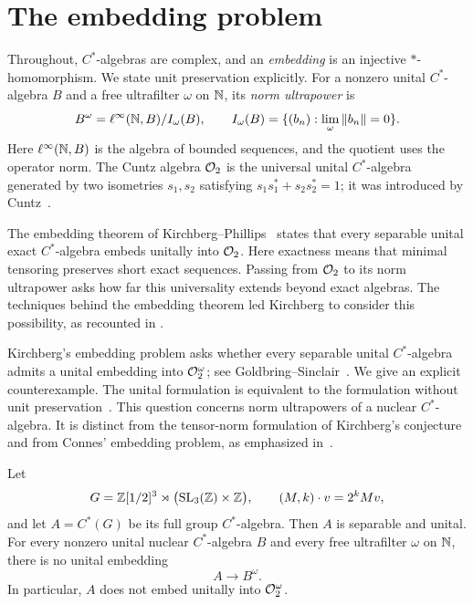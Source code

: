 \section{The embedding problem}
\label{sec:introduction}

Throughout, $C^*$-algebras are complex, and an \emph{embedding} is an
injective $*$-homomorphism. We state unit preservation explicitly.
For a nonzero unital $C^*$-algebra $B$ and a free ultrafilter $\omega$ on
$\mathbb N$, its \emph{norm ultrapower} is
\[
 B^\omega=\ell^\infty(\mathbb N,B)/I_\omega(B),\qquad
 I_\omega(B)=\{(b_n):\lim_\omega\|b_n\|=0\}.
\]
Here $\ell^\infty(\mathbb N,B)$ is the algebra of bounded sequences, and the
quotient uses the operator norm. The Cuntz algebra $\mathcal O_2$ is the universal
unital $C^*$-algebra generated by two isometries $s_1,s_2$ satisfying
$s_1s_1^*+s_2s_2^*=1$; it was introduced by Cuntz~\cite{Cuntz1977}.

The embedding theorem of Kirchberg--Phillips~\cite{KirchbergPhillips2000}
states that every separable unital exact $C^*$-algebra embeds unitally
into $\mathcal O_2$. Here exactness means that minimal tensoring preserves
short exact sequences. Passing from $\mathcal O_2$ to its norm ultrapower
asks how far this universality extends beyond exact algebras. The
techniques behind the embedding theorem led Kirchberg to consider this
possibility, as recounted in \cite[Section~1]{GoldbringSinclair2015}.

Kirchberg's embedding problem asks whether every separable unital
$C^*$-algebra admits a unital embedding into $\mathcal O_2^\omega$; see
Goldbring--Sinclair~\cite[Section~3.1]{GoldbringSinclair2015}. We give an explicit
counterexample. The unital formulation is equivalent to the formulation
without unit preservation~\cite[Section~3.1]{GoldbringSinclair2015}.
This question concerns norm ultrapowers of a nuclear
$C^*$-algebra. It is distinct from the tensor-norm formulation of
Kirchberg's conjecture and from Connes' embedding problem, as emphasized
in~\cite[Section~1]{GoldbringSinclair2015}.

\begin{theorem}\label{thm:main}
Let
\[
 G=\mathbb Z[1/2]^3\rtimes\bigl(\operatorname{SL}_3(\mathbb Z)\times\mathbb Z\bigr),
 \qquad (M,k)\cdot v=2^kMv,
\]
and let $A=C^*(G)$ be its full group $C^*$-algebra. Then $A$ is separable
and unital. For every nonzero unital nuclear $C^*$-algebra $B$ and every
free ultrafilter $\omega$ on $\mathbb N$, there is no unital embedding
\[
 A\longrightarrow B^\omega.
\]
In particular, $A$ does not embed unitally into $\mathcal O_2^\omega$.
\end{theorem}

